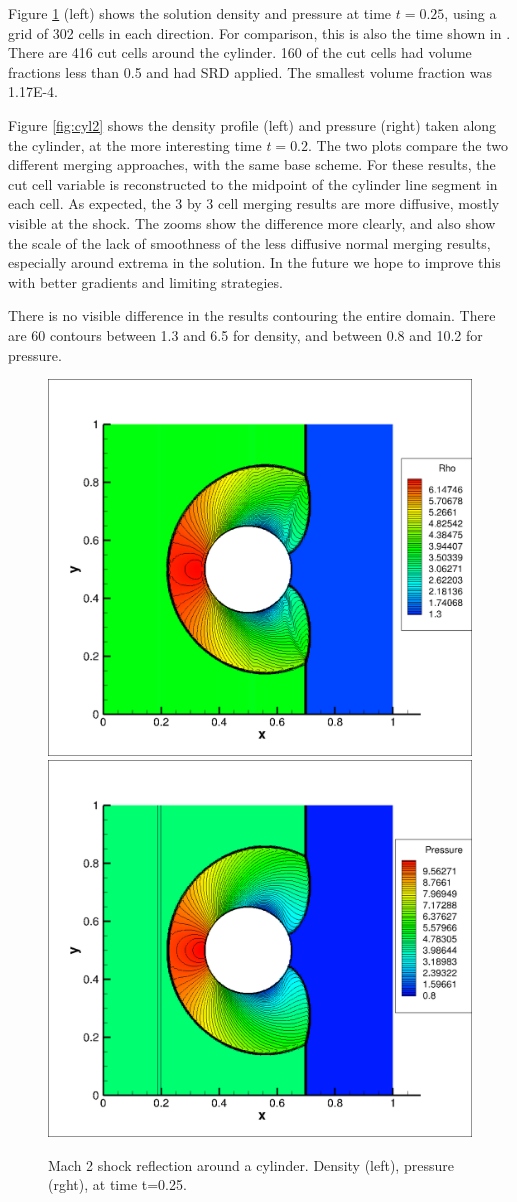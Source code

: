 Figure \ref{fig:cyl1} (left) shows the solution density and pressure  at time $t=0.25$,
using a grid of 302 cells in each direction. For comparison, this is also 
the time shown in
\cite{mjb-hel-rjl:hbox2}. There are 416 cut cells
around the cylinder. 160 of the cut cells had volume fractions less than
0.5 and had SRD applied.  The smallest volume fraction was 1.17E-4.   

Figure \ref{fig:cyl2}
shows the density profile (left) and pressure (right) 
taken along the cylinder, at the more
interesting time $t=0.2$. The two plots compare the two different merging
approaches, with the same base scheme. 
For these results, the cut cell variable is
reconstructed to the midpoint of the cylinder line segment in each  cell.  
As expected, the 3 by 3 cell merging results are more
diffusive, mostly visible at the shock. The zooms show the difference more
clearly, and also show the scale of the lack of smoothness of the less
diffusive normal merging results, especially around extrema in the
solution. In the future we hope to improve this
with better gradients and limiting strategies.

There is no visible 
difference in the results contouring the entire domain.
There are 60 contours between 1.3 and 6.5 for density, and between 0.8 and
10.2 for pressure.

\begin{figure}
\begin{center}
\hspace*{-.4in}
\includegraphics[width=0.48\linewidth,trim=10 10 200 10,clip]{figs/density_302_normal_muscl_cyl.png}
\vspace*{1.0in}
\includegraphics[width=0.48\linewidth,trim=10 10 200 10,clip]{figs/pressure_302_normal_muscl_cyl.png}
\caption{\sf Mach 2 shock reflection around a cylinder. Density (left),
pressure (rght), at time t=0.25.}
\label{fig:cyl1}
\end{center}
\end{figure}

